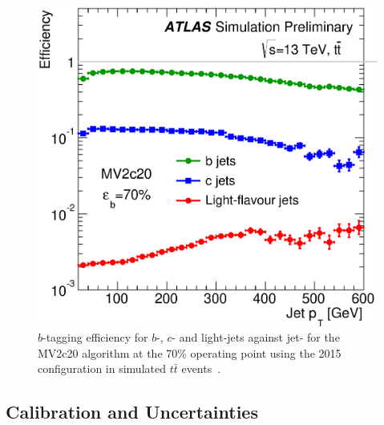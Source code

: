 \begin{figure}[!htb]
  \begin{center}
    \includegraphics[width=0.5\linewidth, angle=0]{figs/Objects/bjets_perf_pt.eps} 
  \end{center}
  \vspace{-1em}
  \caption[$b$-tagging efficiency for $b$-jets, $c$-jets and light-jets as a function of jet-\pT{} for the MV2c20 algorithm at the 70\% operating point in the 2015 configuration.]
          {\label{fig:obj-bjets_perf_pt} $b$-tagging efficiency for $b$-, $c$- and light-jets against jet-\pT{} 
            for the MV2c20 algorithm at the 70\% operating point using the 2015 configuration in simulated $t\bar{t}$ events~\cite{obj-bjets_algo_2015}.}
\end{figure}

\subsection{Calibration and Uncertainties}
\label{sec:obj-bjets_calib}

